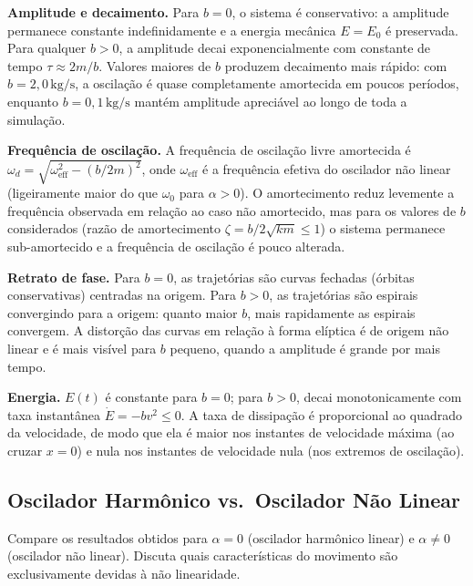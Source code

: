 \textbf{Amplitude e decaimento.} Para $b = 0$, o sistema é conservativo: a amplitude permanece constante indefinidamente e a energia mecânica $E = E_0$ é preservada. Para qualquer $b > 0$, a amplitude decai exponencialmente com constante de tempo $\tau \approx 2m/b$. Valores maiores de $b$ produzem decaimento mais rápido: com $b = 2{,}0\,\text{kg/s}$, a oscilação é quase completamente amortecida em poucos períodos, enquanto $b = 0{,}1\,\text{kg/s}$ mantém amplitude apreciável ao longo de toda a simulação.

\textbf{Frequência de oscilação.} A frequência de oscilação livre amortecida é $\omega_d = \sqrt{\omega_\text{eff}^2 - (b/2m)^2}$, onde $\omega_\text{eff}$ é a frequência efetiva do oscilador não linear (ligeiramente maior do que $\omega_0$ para $\alpha > 0$). O amortecimento reduz levemente a frequência observada em relação ao caso não amortecido, mas para os valores de $b$ considerados (razão de amortecimento $\zeta = b/2\sqrt{km} \leq 1$) o sistema permanece sub-amortecido e a frequência de oscilação é pouco alterada.

\textbf{Retrato de fase.} Para $b = 0$, as trajetórias são curvas fechadas (órbitas conservativas) centradas na origem. Para $b > 0$, as trajetórias são espirais convergindo para a origem: quanto maior $b$, mais rapidamente as espirais convergem. A distorção das curvas em relação à forma elíptica é de origem não linear e é mais visível para $b$ pequeno, quando a amplitude é grande por mais tempo.

\textbf{Energia.} $E(t)$ é constante para $b = 0$; para $b > 0$, decai monotonicamente com taxa instantânea $\dot{E} = -bv^2 \leq 0$. A taxa de dissipação é proporcional ao quadrado da velocidade, de modo que ela é maior nos instantes de velocidade máxima (ao cruzar $x = 0$) e nula nos instantes de velocidade nula (nos extremos de oscilação).

\subsection{Oscilador Harmônico vs.\ Oscilador Não Linear}

\begin{questao}
Compare os resultados obtidos para $\alpha = 0$ (oscilador harmônico linear) e $\alpha \neq 0$ (oscilador não linear). Discuta quais características do movimento são exclusivamente devidas à não linearidade.
\end{questao}

